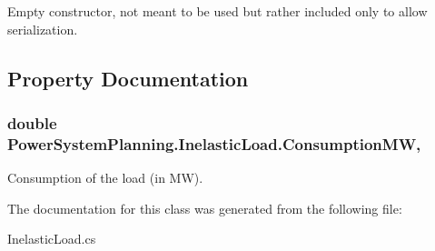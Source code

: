 Empty constructor, not meant to be used but rather included only to allow serialization. 



\subsection{Property Documentation}
\subsubsection[{\texorpdfstring{Consumption\+MW}{ConsumptionMW}}]{\setlength{\rightskip}{0pt plus 5cm}double Power\+System\+Planning.\+Inelastic\+Load.\+Consumption\+MW\hspace{0.3cm}{\ttfamily [get]}, {\ttfamily [set]}}\hypertarget{class_power_system_planning_1_1_inelastic_load_ad37cc0084cc3307039345b7d683bd51d}{}\label{class_power_system_planning_1_1_inelastic_load_ad37cc0084cc3307039345b7d683bd51d}


Consumption of the load (in MW). 



The documentation for this class was generated from the following file\+:\begin{DoxyCompactItemize}
\item 
Inelastic\+Load.\+cs\end{DoxyCompactItemize}
